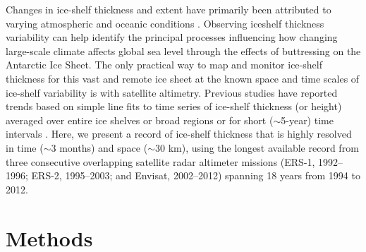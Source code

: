 Changes in ice-shelf thickness and extent have primarily been attributed to
varying atmospheric and oceanic conditions \parencite{Scambos2003, Dutrieux2014}.
Observing iceshelf thickness variability can help identify the principal 
processes influencing how changing large-scale climate affects global sea level
through the effects of buttressing on the Antarctic Ice Sheet. The only
practical way to map and monitor ice-shelf thickness for this vast and remote
ice sheet at the known space and time scales of ice-shelf variability is with
satellite altimetry. Previous studies have reported trends based on simple line
fits to time series of ice-shelf thickness (or height) averaged over entire ice
shelves or broad regions \parencite{Shepherd2010, Zwally2005} or for short 
($\sim$5-year) time intervals \parencite{Pritchard2012, Rignot2013,Depoorter2013}.
Here, we present a record of ice-shelf thickness that is highly resolved in 
time ($\sim$3 months) and space ($\sim$30 km), using the longest available 
record from three consecutive overlapping satellite radar altimeter missions
(ERS-1, 1992--1996; ERS-2, 1995--2003; and Envisat, 2002--2012) spanning 18
years from 1994 to 2012.


\section{Methods}

